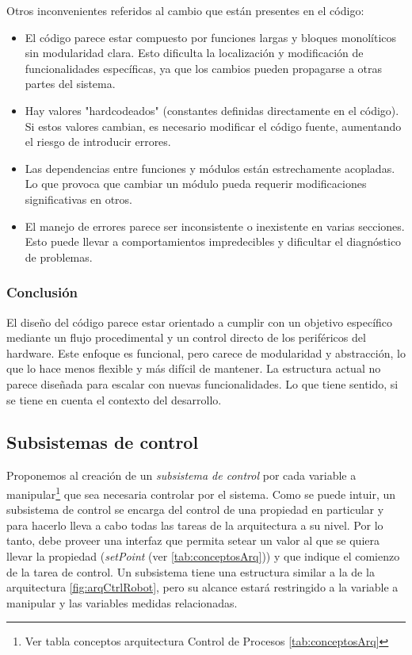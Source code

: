 Otros inconvenientes referidos al cambio que están presentes en el código:
\begin{itemize}
\item El código parece estar compuesto por funciones largas y bloques monolíticos sin modularidad clara. Esto dificulta la localización y modificación de funcionalidades específicas, ya que los cambios pueden propagarse a otras partes del sistema.
\item Hay valores "hardcodeados" (constantes definidas directamente en el código). Si estos valores cambian, es necesario modificar el código fuente, aumentando el riesgo de introducir errores.
\item Las dependencias entre funciones y módulos están estrechamente acopladas. Lo que provoca que cambiar un módulo pueda requerir modificaciones significativas en otros.
\item El manejo de errores parece ser inconsistente o inexistente en varias secciones. Esto puede llevar a comportamientos impredecibles y dificultar el diagnóstico de problemas.
\end{itemize}

\subsubsection*{Conclusión}

El diseño del código parece estar orientado a cumplir con un objetivo específico mediante un flujo procedimental y un control directo de los periféricos del hardware. Este enfoque es funcional, pero carece de modularidad y abstracción, lo que lo hace menos flexible y más difícil de mantener. La estructura actual no parece diseñada para escalar con nuevas funcionalidades. Lo que tiene sentido, si se tiene en cuenta el contexto del desarrollo.




\subsection{Subsistemas de control}

Proponemos al creación de un \textit{subsistema de control} por cada variable a manipular\footnote{Ver tabla conceptos arquitectura Control de Procesos \ref{tab:conceptosArq}} que sea necesaria controlar por el sistema. Como se puede intuir, un subsistema de control se encarga del control de una propiedad en particular y para hacerlo lleva a cabo todas las tareas de la arquitectura a su nivel. Por lo tanto, debe proveer una interfaz que permita setear un valor al que se quiera llevar la propiedad (\textit{setPoint} (ver  \ref{tab:conceptosArq})) y que indique el comienzo de la tarea de control. Un subsistema tiene una estructura similar a la de la arquitectura \ref{fig:arqCtrlRobot}, pero su alcance estará restringido a la variable a manipular y las variables medidas relacionadas.


